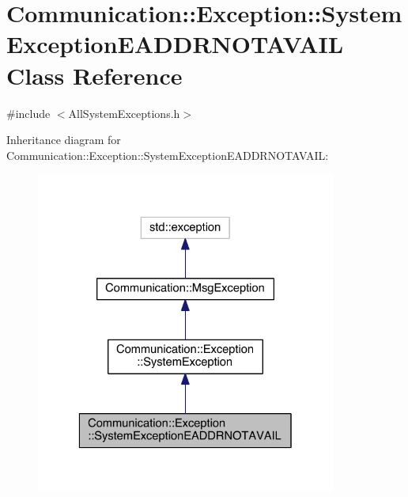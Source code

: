 \hypertarget{class_communication_1_1_exception_1_1_system_exception_e_a_d_d_r_n_o_t_a_v_a_i_l}{}\section{Communication\+:\+:Exception\+:\+:System\+Exception\+E\+A\+D\+D\+R\+N\+O\+T\+A\+V\+A\+I\+L Class Reference}
\label{class_communication_1_1_exception_1_1_system_exception_e_a_d_d_r_n_o_t_a_v_a_i_l}


{\ttfamily \#include $<$All\+System\+Exceptions.\+h$>$}



Inheritance diagram for Communication\+:\+:Exception\+:\+:System\+Exception\+E\+A\+D\+D\+R\+N\+O\+T\+A\+V\+A\+I\+L\+:\nopagebreak
\begin{figure}[H]
\begin{center}
\leavevmode
\includegraphics[width=280pt]{class_communication_1_1_exception_1_1_system_exception_e_a_d_d_r_n_o_t_a_v_a_i_l__inherit__graph}
\end{center}
\end{figure}


